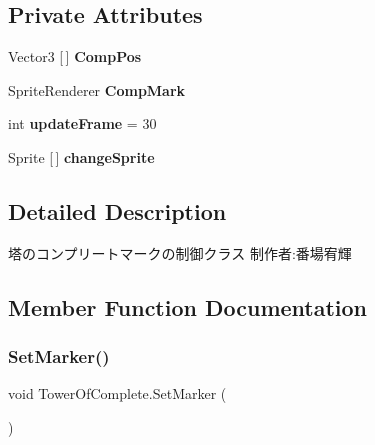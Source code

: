 \subsection*{Private Attributes}
\begin{DoxyCompactItemize}
\item 
\mbox{\label{class_tower_of_complete_a97a0f491832941c9589a4ff49982b255}} 
Vector3 \mbox{[}$\,$\mbox{]} {\bfseries Comp\+Pos}
\item 
\mbox{\label{class_tower_of_complete_a3a630142309e4412e96dda01fb8f8b4b}} 
Sprite\+Renderer {\bfseries Comp\+Mark}
\item 
\mbox{\label{class_tower_of_complete_a7cdfa6482522af569c57499dfdbfbdcb}} 
int {\bfseries update\+Frame} = 30
\item 
\mbox{\label{class_tower_of_complete_a3577ddfa76319fda6c1edf48f9b7299d}} 
Sprite \mbox{[}$\,$\mbox{]} {\bfseries change\+Sprite}
\end{DoxyCompactItemize}


\subsection{Detailed Description}
塔のコンプリートマークの制御クラス 制作者\+:番場宥輝 



\subsection{Member Function Documentation}
\mbox{\label{class_tower_of_complete_a1930d50f706179ad260ced8553549a15}} 
\subsubsection{\texorpdfstring{Set\+Marker()}{SetMarker()}}
{\footnotesize\ttfamily void Tower\+Of\+Complete.\+Set\+Marker (\begin{DoxyParamCaption}{ }\end{DoxyParamCaption})\hspace{0.3cm}{\ttfamily [inline]}}



